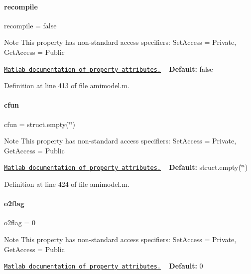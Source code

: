 \paragraph{\texorpdfstring{recompile}{recompile}}
{\footnotesize\ttfamily recompile = false}

\begin{DoxyNote}{Note}
This property has non-\/standard access specifiers\+: {\ttfamily Set\+Access = Private, Get\+Access = Public} 

\href{http://www.mathworks.com/help/matlab/matlab_oop/property-attributes.html}{\tt Matlab documentation of property attributes.} ~\newline
{\bfseries Default\+:} false 
\end{DoxyNote}


Definition at line 413 of file amimodel.\+m.

\mbox{\label{classamimodel_afec809c626a350367485aa6aaea6b585}} 
\paragraph{\texorpdfstring{cfun}{cfun}}
{\footnotesize\ttfamily cfun = struct.\+empty(\char`\"{}\char`\"{})}

\begin{DoxyNote}{Note}
This property has non-\/standard access specifiers\+: {\ttfamily Set\+Access = Private, Get\+Access = Public} 

\href{http://www.mathworks.com/help/matlab/matlab_oop/property-attributes.html}{\tt Matlab documentation of property attributes.} ~\newline
{\bfseries Default\+:} struct.\+empty(\char`\"{}\char`\"{}) 
\end{DoxyNote}


Definition at line 424 of file amimodel.\+m.

\mbox{\label{classamimodel_a2b89e3b4e249878a2d436ee337952c4f}} 
\paragraph{\texorpdfstring{o2flag}{o2flag}}
{\footnotesize\ttfamily o2flag = 0}

\begin{DoxyNote}{Note}
This property has non-\/standard access specifiers\+: {\ttfamily Set\+Access = Private, Get\+Access = Public} 

\href{http://www.mathworks.com/help/matlab/matlab_oop/property-attributes.html}{\tt Matlab documentation of property attributes.} ~\newline
{\bfseries Default\+:} 0 
\end{DoxyNote}


